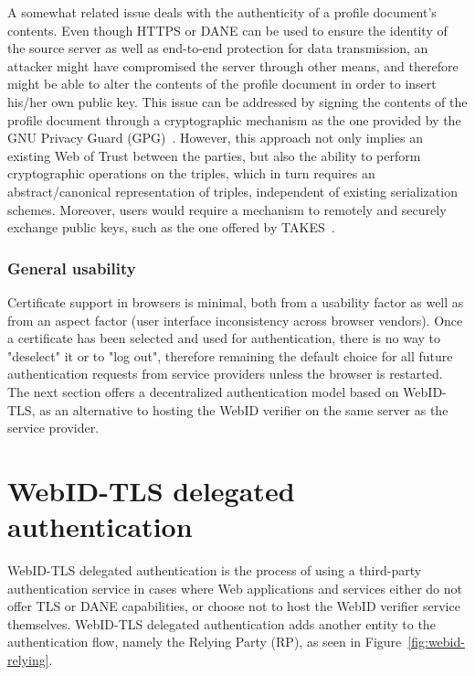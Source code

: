 A somewhat related issue deals with the authenticity of a profile document's contents. Even though HTTPS or DANE can be used to ensure the identity of the source server as well as end-to-end protection for data transmission, an attacker might have compromised the server through other means, and therefore might be able to alter the contents of the profile document in order to insert his/her own public key. This issue can be addressed by signing the contents of the profile document through a cryptographic mechanism as the one provided by the GNU Privacy Guard (GPG)~\cite{koch2003gnu}. However, this approach not only implies an existing Web of Trust between the parties, but also the ability to perform cryptographic operations on the triples, which in turn requires an abstract/canonical representation of triples, independent of existing serialization schemes. Moreover, users would require a mechanism to remotely and securely exchange public keys, such as the one offered by TAKES~\cite{cheneau2011trustful}.\\

\subsubsection{General usability}
Certificate support in browsers is minimal, both from a usability factor as well as from an aspect factor (user interface inconsistency across browser vendors). Once a certificate has been selected and used for authentication, there is no way to "deselect" it or to "log out", therefore remaining the default choice for all future authentication requests from service providers unless the browser is restarted.\\

The next section offers a decentralized authentication model based on WebID-TLS, as an alternative to hosting the WebID verifier on the same server as the service provider.

\section{WebID-TLS delegated authentication}
\label{sec:webid-tls_delegated_auth}
WebID-TLS delegated authentication is the process of using a third-party authentication service in cases where Web applications and services either do not offer TLS or DANE capabilities, or choose not to host the WebID verifier service themselves. WebID-TLS delegated authentication adds another entity to the authentication flow, namely the Relying Party (RP), as seen in Figure~\ref{fig:webid-relying}.\\

